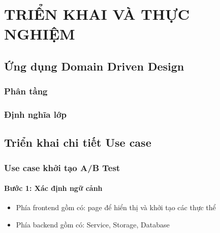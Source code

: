 \chapter{TRIỂN KHAI VÀ THỰC NGHIỆM}

\section{Ứng dụng Domain Driven Design}

\subsection{Phân tầng}

\subsection{Định nghĩa lớp}

%
%

\section{Triển khai chi tiết Use case}

\subsection{Use case khởi tạo A/B Test}

\subsubsection{Bước 1: Xác định ngữ cảnh}

\begin{itemize}
	\item Phía frontend gồm có: page để hiển thị và khởi tạo các thực thể
	\item Phía backend gồm có: Service, Storage, Database
\end{itemize}


